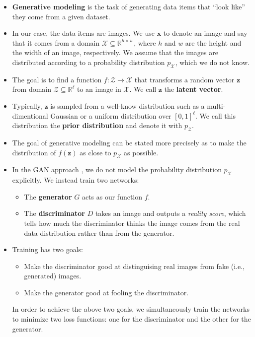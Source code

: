 \documentclass[10pt]{article}
\newcommand{\ve}[1]{\pmb{#1}}
\newcommand{\Real}{\mathbb{R}}
\begin{document}
  \begin{itemize}
  	\item \textbf{Generative modeling} is the task of generating data items that ``look like'' they come from a given dataset. 

  	\item In our case, the data items are images. We use $\ve{x}$ to denote an image and say that it comes from a domain $\mathcal{X} \subseteq \Real^{h \times w}$, where $h$ and $w$ are the height and the width of an image, respectively. We assume that the images are distributed according to a probability distribution $p_{\mathcal{X}}$, which we do not know.

  	\item The goal is to find a function $f: \mathcal{Z} \rightarrow \mathcal{X}$ that transforms a random vector $\ve{z}$ from domain $\mathcal{Z} \subseteq \Real^{\ell}$ to an image in $\mathcal{X}$. We call $\ve{z}$ the \textbf{latent vector}.

  	\item Typically, $\ve{z}$ is sampled from a well-know distribution such as a multi-dimentional Gaussian or a uniform distribution over $[0,1]^\ell$. We call this distribution the \textbf{prior distribution} and denote it with $p_{\mathcal{Z}}$. 

  	\item The goal of generative modeling can be stated more precisely as to make the distribution of $f(\ve{z})$ as close to $p_{\mathcal{X}}$ as possible.

  	\item In the GAN approach \cite{Goodfellow:2014}, we do not model the probability distribution $p_{\mathcal{X}}$ explicitly. We instead train two networks:
  	\begin{itemize}
  		\item The \textbf{generator} $G$ acts as our function $f$.
  		\item The \textbf{discriminator} $D$ takes an image and outputs a \emph{reality score}, which tells how much the discriminator thinks the image comes from the real data distribution rather than from the generator. 
  	\end{itemize}

  	\item Training has two goals:
  	\begin{itemize}
  		\item Make the discriminator good at distinguising real images from fake (i.e., generated) images.
  		\item Make the generator good at fooling the discriminator.
  	\end{itemize}
  	In order to achieve the above two goals, we simultaneously train the networks to minimize two loss functions: one for the discriminator and the other for the generator.


\end{itemize}
\end{document}
